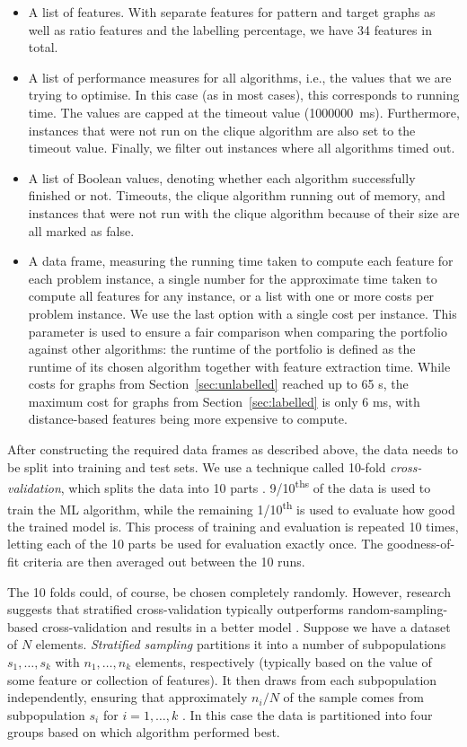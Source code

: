 \documentclass{l4proj}
\theoremstyle{definition}
\theoremstyle{remark}
\begin{document}
\begin{itemize}
\item A list of features. With separate features for pattern and target graphs
  as well as ratio features and the labelling percentage, we have 34 features in
  total.
\item A list of performance measures for all algorithms, i.e., the values that
  we are trying to optimise. In this case (as in most cases), this corresponds
  to running time. The values are capped at the timeout value (\num{1000000}~ms).
  Furthermore, instances that were not run on the clique algorithm are also set
  to the timeout value. Finally, we filter out instances where all algorithms
  timed out.
\item A list of Boolean values, denoting whether each algorithm successfully
  finished or not. Timeouts, the clique algorithm running out of memory, and
  instances that were not run with the clique algorithm because of their size
  are all marked as false.
\item A data frame, measuring the running time taken to compute each feature for
  each problem instance, a single number for the approximate time taken to
  compute all features for any instance, or a list with one or more costs per
  problem instance. We use the last option with a single cost per instance. This
  parameter is used to ensure a fair comparison when comparing the portfolio
  against other algorithms: the runtime of the portfolio is defined as the
  runtime of its chosen algorithm together with feature extraction time.
  While costs for graphs from Section~\ref{sec:unlabelled} reached up to 65 s,
  the maximum cost for graphs from Section~\ref{sec:labelled} is only 6 ms, with
  distance-based features being more expensive to compute.
\end{itemize}

After constructing the required data frames as described above, the data needs to
be split into training and test sets. We use a technique called 10-fold
\emph{cross-validation}, which splits the data into 10 parts \cite{citeulike:1304145}.
9/10\textsuperscript{ths} of the data is used to train the ML algorithm, while
the remaining 1/10\textsuperscript{th} is used to evaluate how good the trained
model is. This process of training and evaluation is repeated 10 times, letting
each of the 10 parts be used for evaluation exactly once. The goodness-of-fit
criteria are then averaged out between the 10 runs.

The 10 folds could, of course, be chosen completely randomly. However, research
suggests that stratified cross-validation typically outperforms
random-sampling-based cross-validation and results in a better model
\cite{DBLP:conf/ijcai/Kohavi95}. Suppose we have a dataset of $N$ elements.
\emph{Stratified sampling} partitions it into a number of subpopulations $s_1,
\dots, s_k$ with $n_1, \dots, n_k$ elements, respectively (typically based on
the value of some feature or collection of features). It then draws from each
subpopulation independently, ensuring that approximately $n_i/N$ of the sample
comes from subpopulation $s_i$ for $i = 1, \dots, k$ \cite{lohr2009sampling}. In
this case the data is partitioned into four groups based on which algorithm
performed best.
\end{document}
